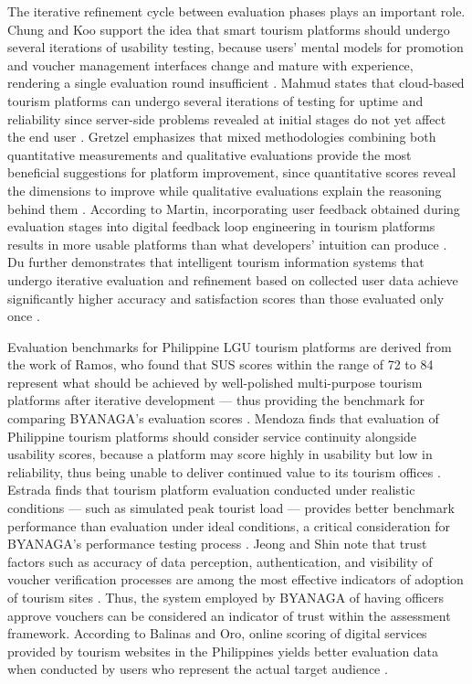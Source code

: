\documentclass{research}
\begin{document}
The iterative refinement cycle between evaluation phases plays an important role. Chung and Koo support the idea that smart tourism platforms should undergo several iterations of usability testing, because users' mental models for promotion and voucher management interfaces change and mature with experience, rendering a single evaluation round insufficient \cite{chung2022}. Mahmud states that cloud-based tourism platforms can undergo several iterations of testing for uptime and reliability since server-side problems revealed at initial stages do not yet affect the end user \cite{mahmud2022}. Gretzel emphasizes that mixed methodologies combining both quantitative measurements and qualitative evaluations provide the most beneficial suggestions for platform improvement, since quantitative scores reveal the dimensions to improve while qualitative evaluations explain the reasoning behind them \cite{gretzel2023}. According to Martin, incorporating user feedback obtained during evaluation stages into digital feedback loop engineering in tourism platforms results in more usable platforms than what developers' intuition can produce \cite{martin2023}. Du further demonstrates that intelligent tourism information systems that undergo iterative evaluation and refinement based on collected user data achieve significantly higher accuracy and satisfaction scores than those evaluated only once \cite{du2021}.

Evaluation benchmarks for Philippine LGU tourism platforms are derived from the work of Ramos, who found that SUS scores within the range of 72 to 84 represent what should be achieved by well-polished multi-purpose tourism platforms after iterative development — thus providing the benchmark for comparing BYANAGA's evaluation scores \cite{ramos2024}. Mendoza finds that evaluation of Philippine tourism platforms should consider service continuity alongside usability scores, because a platform may score highly in usability but low in reliability, thus being unable to deliver continued value to its tourism offices \cite{mendoza2024}. Estrada finds that tourism platform evaluation conducted under realistic conditions — such as simulated peak tourist load — provides better benchmark performance than evaluation under ideal conditions, a critical consideration for BYANAGA's performance testing process \cite{estrada2025}. Jeong and Shin note that trust factors such as accuracy of data perception, authentication, and visibility of voucher verification processes are among the most effective indicators of adoption of tourism sites \cite{jeong2023}. Thus, the system employed by BYANAGA of having officers approve vouchers can be considered an indicator of trust within the assessment framework. According to Balinas and Oro, online scoring of digital services provided by tourism websites in the Philippines yields better evaluation data when conducted by users who represent the actual target audience \cite{balinas2024}.
\end{document}
